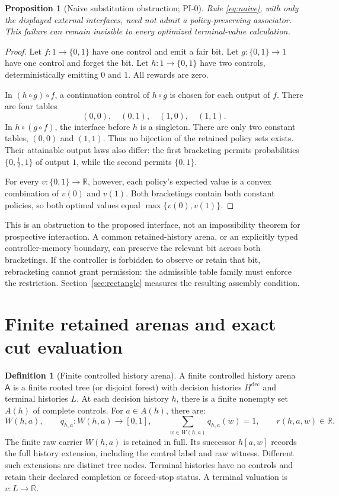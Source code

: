 \documentclass[11pt]{article}
\newtheorem{proposition}[theorem]{Proposition}
\theoremstyle{definition}
\newtheorem{definition}[theorem]{Definition}
\newcommand{\R}{\mathbb R}
\newcommand{\A}{\mathsf A}
\begin{document}
\begin{proposition}[Naive substitution obstruction; PI-0]
\label{prop:naive}
Rule \eqref{eq:naive}, with only the displayed external interfaces, need
not admit a policy-preserving associator. This failure can remain invisible
to every optimized terminal-value calculation.
\end{proposition}
\begin{proof}
Let \(f:1\to\{0,1\}\) have one control and emit a fair bit. Let
\(g:\{0,1\}\to1\) have one control and forget the bit. Let
\(h:1\to\{0,1\}\) have two controls, deterministically emitting \(0\) and
\(1\). All rewards are zero.

In \((h\circ g)\circ f\), a continuation control of \(h\circ g\) is chosen
for each output of \(f\). There are four tables
\[
 (0,0),\quad(0,1),\quad(1,0),\quad(1,1).
\]
In \(h\circ(g\circ f)\), the interface before \(h\) is a singleton. There
are only two constant tables, \((0,0)\) and \((1,1)\). Thus no bijection
of the retained policy sets exists. Their attainable output laws also
differ: the first bracketing permits probabilities
\(\{0,\tfrac12,1\}\) of output \(1\), while the second permits
\(\{0,1\}\).

For every \(v:\{0,1\}\to\R\), however, each policy's expected value is a
convex combination of \(v(0)\) and \(v(1)\). Both bracketings contain both
constant policies, so both optimal values equal
\(\max\{v(0),v(1)\}\).
\end{proof}

This is an obstruction to the proposed interface, not an impossibility
theorem for prospective interaction. A common retained-history arena, or
an explicitly typed controller-memory boundary, can preserve the relevant
bit across both bracketings. If the controller is forbidden to observe or
retain that bit, rebracketing cannot grant permission: the admissible table
family must enforce the restriction. Section~\ref{sec:rectangle} measures
the resulting assembly condition.

\section{Finite retained arenas and exact cut evaluation}
\label{sec:cuts}
\begin{definition}[Finite controlled history arena]
\label{def:arena}
A finite controlled history arena \(\A\) is a finite rooted tree (or
disjoint forest) with decision histories \(H^{\mathrm{dec}}\) and terminal
histories \(L\). At each decision history \(h\), there is a finite nonempty
set \(A(h)\) of complete controls. For \(a\in A(h)\), there are:
\[
 W(h,a),\qquad
 q_{h,a}:W(h,a)\to[0,1],\qquad
 \sum_{w\in W(h,a)}q_{h,a}(w)=1,\qquad
 r(h,a,w)\in\R.
\]
The finite raw carrier \(W(h,a)\) is retained in full. Its successor
\(h[a,w]\) records the full history extension, including the control label
and raw witness. Different such extensions are distinct tree nodes.
Terminal histories have no controls and retain their declared completion
or forced-stop status. A terminal valuation is \(v:L\to\R\).
\end{definition}
\end{document}
